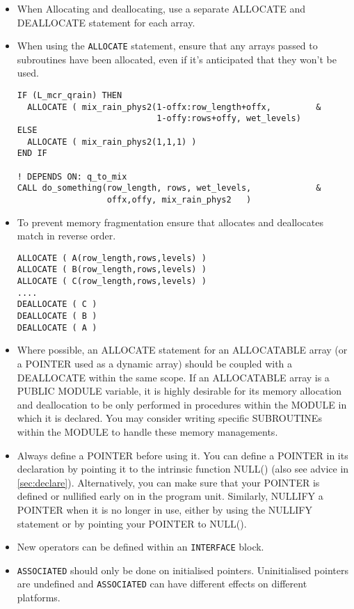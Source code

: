 \begin{itemize}
\item When Allocating and deallocating, use a separate ALLOCATE and
DEALLOCATE statement for each array.
\item When using the \verb|ALLOCATE| statement,
ensure that any arrays passed to subroutines have been allocated,
even if it's anticipated that they won't be used.
\begin{verbatim}
IF (L_mcr_qrain) THEN
  ALLOCATE ( mix_rain_phys2(1-offx:row_length+offx,         &
                            1-offy:rows+offy, wet_levels)
ELSE
  ALLOCATE ( mix_rain_phys2(1,1,1) )
END IF

! DEPENDS ON: q_to_mix
CALL do_something(row_length, rows, wet_levels,             &
                  offx,offy, mix_rain_phys2   )
\end{verbatim}

\item To prevent memory fragmentation ensure that allocates and deallocates
match in reverse order.
\begin{verbatim}
ALLOCATE ( A(row_length,rows,levels) )
ALLOCATE ( B(row_length,rows,levels) )
ALLOCATE ( C(row_length,rows,levels) )
....
DEALLOCATE ( C )
DEALLOCATE ( B )
DEALLOCATE ( A )
\end{verbatim}

\item Where possible, an ALLOCATE statement for an ALLOCATABLE array
(or a POINTER used as a dynamic array)
should be coupled with a DEALLOCATE within the same scope.
If an ALLOCATABLE array is a PUBLIC MODULE variable,
it is highly desirable for its memory allocation and deallocation
to be only performed in procedures within the MODULE in which it is declared.
You may consider writing specific SUBROUTINEs within the MODULE
to handle these memory managements.
\item Always define a POINTER before using it.
You can define a POINTER in its declaration by pointing
it to the intrinsic function NULL() (also see advice in \ref{sec:declare}). Alternatively,
you can make sure that your POINTER is defined or
nullified early on in the program unit.
Similarly, NULLIFY a POINTER when it is no longer in use,
either by using the NULLIFY statement or by pointing your POINTER to NULL().
\item New operators can be defined within an \verb|INTERFACE| block.
\item \verb|ASSOCIATED| should only be done on initialised pointers.  Uninitialised pointers are undefined and \verb|ASSOCIATED| can have different effects on different platforms.
\end{itemize}



